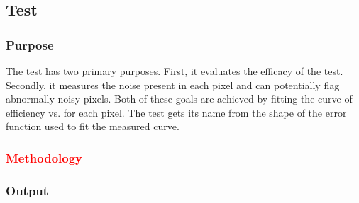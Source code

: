 
\newpage

\subsection{\scurves Test}
\label{ss:scurves}

\subsubsection{Purpose}

The \scurves test has two primary purposes.
First, it evaluates the efficacy of the \trimming test.
Secondly, it measures the noise present in each pixel and can potentially flag abnormally noisy pixels.
Both of these goals are achieved by fitting the curve of efficiency vs. \vcal for each pixel.
The test gets its name from the shape of the error function used to fit the measured curve.

\subsubsection{\textcolor{red}{Methodology}}

\subsubsection{Output}

